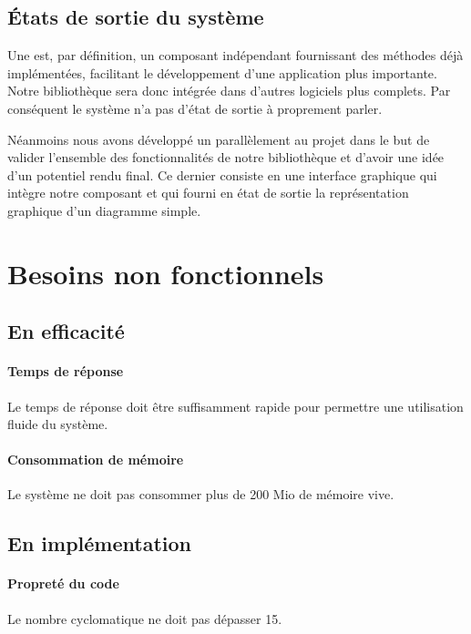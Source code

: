 \documentclass[12pt,a4paper,openany]{report}
\begin{document}
	\subsection{États de sortie du système}
	Une  
	est, par définition, un composant indépendant fournissant des méthodes déjà implémentées, facilitant le développement d'une application plus importante. 
	Notre bibliothèque sera donc intégrée dans d'autres logiciels plus complets. Par conséquent le système n'a pas d'état de sortie à proprement parler.

	Néanmoins nous avons développé un 
	parallèlement au projet dans le but de valider l'ensemble
	des fonctionnalités de notre bibliothèque et d'avoir une idée d'un potentiel rendu final.
	Ce dernier consiste en une interface graphique qui intègre notre composant et qui fourni en 
	état de sortie la représentation graphique d'un diagramme simple.

	\section{Besoins non fonctionnels}
	\subsection{En efficacité}
			\paragraph{Temps de réponse} Le temps de réponse doit être suffisamment rapide pour permettre une utilisation fluide du système.
			\paragraph{Consommation de mémoire} Le système ne doit pas consommer plus de 200 Mio de mémoire vive.
		\subsection{En implémentation}
			\paragraph{Propreté du code} Le nombre cyclomatique ne doit pas dépasser 15.
\end{document}
